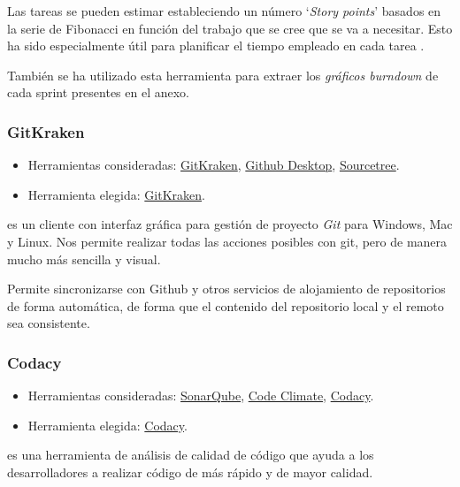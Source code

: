 Las tareas se pueden estimar estableciendo un número `\textit{Story points}' basados en la serie de Fibonacci en función del trabajo que se cree que se va a necesitar. Esto ha sido especialmente útil para planificar el tiempo empleado en cada tarea \cite{misc:zenhubestimate}.

También se ha utilizado esta herramienta para extraer los \textit{gráficos burndown} de cada sprint presentes en el anexo.

\subsubsection{GitKraken}

\begin{itemize}
	\tightlist
	\item
	Herramientas consideradas:
	\href{https://www.gitkraken.com/}{GitKraken}, 
	\href{https://desktop.github.com/}{Github Desktop},
	\href{https://www.sourcetreeapp.com/}{Sourcetree}.
	\item
	Herramienta elegida:
	\href{https://www.gitkraken.com/}{GitKraken}.
\end{itemize}

 es un cliente con interfaz gráfica para gestión de proyecto \textit{Git} para Windows, Mac y Linux. Nos permite realizar todas las acciones posibles con git, pero de manera mucho más sencilla y visual.

Permite sincronizarse con Github y otros servicios de alojamiento de repositorios de forma automática, de forma que el contenido del repositorio local y el remoto sea consistente.

\subsubsection{Codacy}

\begin{itemize}
	\tightlist
	\item
	Herramientas consideradas:
	\href{https://www.sonarqube.org/}{SonarQube}, 
	\href{https://codeclimate.com/}{Code Climate},
	\href{https://www.codacy.com/}{Codacy}.
	\item
	Herramienta elegida:
	\href{https://www.codacy.com/}{Codacy}.
\end{itemize}

 es una herramienta de análisis de calidad de código que ayuda a los desarrolladores a realizar código de más rápido y de mayor calidad.

